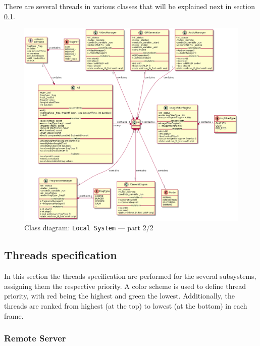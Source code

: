 There are several threads in various classes that will be explained next in section \ref{sec:thre-spec}.
%
\begin{figure}[htb!]
\centering
    \includegraphics[width=1.0\columnwidth]{./img/class-diag-local-2.png}
  \caption{Class diagram: \texttt{Local System} --- part 2/2}%
\label{fig:class-diag-local-2}
\end{figure}

\subsection{Threads specification}
\label{sec:thre-spec}
In this section the threads specification are performed for the several
subsystems, assigning them the respective priority. A color scheme is used to
define thread priority, with red being the highest and green the
lowest. Additionally, the threads are ranked from highest (at the top) to lowest
(at the bottom) in each frame.

\subsubsection{Remote Server}
\label{sec:remote-server-threads}

